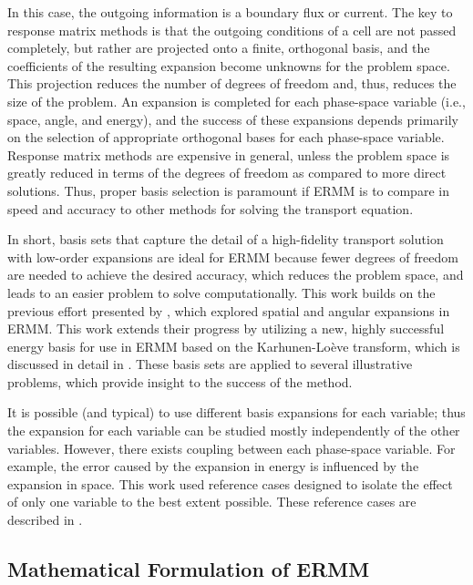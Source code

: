 In this case, the outgoing information is a boundary flux or current.  
The key 
to response matrix methods is that the outgoing conditions of a cell are 
not passed completely, but rather are projected onto a finite, orthogonal 
basis, and the coefficients of the resulting expansion become unknowns for the 
problem space.  This projection reduces the number of degrees of freedom and, 
thus, reduces the size of the problem. An expansion is completed for each 
phase-space variable (i.e., space, angle, and energy), and the success of these 
expansions depends primarily on the selection of appropriate orthogonal bases 
for each phase-space variable. Response matrix methods  are expensive in 
general,
unless the problem space is greatly reduced in terms of the degrees of 
freedom as compared to more direct solutions.  Thus, proper basis selection is 
paramount if ERMM is to compare in speed and accuracy to other methods for 
solving the transport equation.

In short, basis sets that capture the detail of a high-fidelity transport 
solution with low-order expansions are ideal for ERMM because fewer 
degrees of freedom are needed to achieve the desired accuracy, which reduces 
the problem space, and leads to an easier problem to solve computationally. 
This 
work builds on the previous effort presented by \citet{RobertsSerment}, which 
explored spatial and angular expansions in ERMM.  This work extends their 
progress by utilizing a new, highly successful energy basis for use in ERMM 
based on the Karhunen-Lo\`{e}ve transform, which is discussed in detail in 
.  These basis sets are applied to several illustrative 
problems, which provide insight to the success of the method. 

It is possible (and typical) to use different basis expansions for each 
variable; thus the expansion for each variable can be studied mostly 
independently of the other variables.  However, there exists coupling between 
each phase-space variable. For example, the error caused by the expansion in 
energy is influenced by the expansion in space. This work used reference 
cases 
designed to isolate the effect of only one variable to the best extent 
possible. 
 These reference cases are described in .



\subsection{Mathematical Formulation of ERMM}

